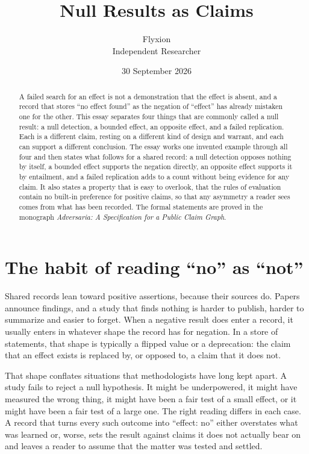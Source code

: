 \documentclass[11pt]{article}
\title{Null Results as Claims}
\author{Flyxion\\\small Independent Researcher}
\date{30 September 2026}
\begin{document}
\maketitle

\begin{abstract}
\noindent
A failed search for an effect is not a demonstration that the effect is absent, and a record that stores ``no effect found'' as the negation of ``effect'' has already mistaken one for the other. This essay separates four things that are commonly called a null result: a null detection, a bounded effect, an opposite effect, and a failed replication. Each is a different claim, resting on a different kind of design and warrant, and each can support a different conclusion. The essay works one invented example through all four and then states what follows for a shared record: a null detection opposes nothing by itself, a bounded effect supports the negation directly, an opposite effect supports it by entailment, and a failed replication adds to a count without being evidence for any claim. It also states a property that is easy to overlook, that the rules of evaluation contain no built-in preference for positive claims, so that any asymmetry a reader sees comes from what has been recorded. The formal statements are proved in the monograph \emph{Adversaria: A Specification for a Public Claim Graph}.
\end{abstract}

\section{The habit of reading ``no'' as ``not''}

Shared records lean toward positive assertions, because their sources do. Papers announce findings, and a study that finds nothing is harder to publish, harder to summarize and easier to forget. When a negative result does enter a record, it usually enters in whatever shape the record has for negation. In a store of statements, that shape is typically a flipped value or a deprecation: the claim that an effect exists is replaced by, or opposed to, a claim that it does not.

That shape conflates situations that methodologists have long kept apart. A study fails to reject a null hypothesis. It might be underpowered, it might have measured the wrong thing, it might have been a fair test of a small effect, or it might have been a fair test of a large one. The right reading differs in each case. A record that turns every such outcome into ``effect: no'' either overstates what was learned or, worse, sets the result against claims it does not actually bear on and leaves a reader to assume that the matter was tested and settled.
\end{document}
